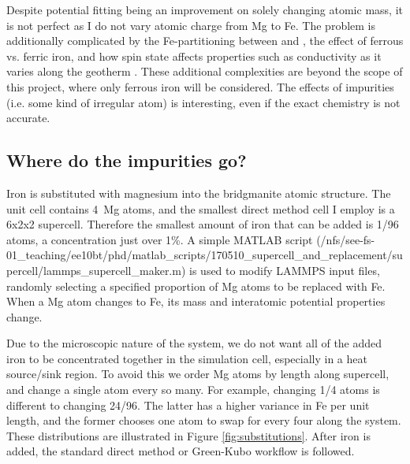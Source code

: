 Despite potential fitting being an improvement on solely changing atomic mass, it is not perfect as I do not vary atomic charge from Mg to Fe. The problem is additionally complicated by the Fe-partitioning between \mgsios and \mgo, the effect of ferrous vs. ferric iron, and how spin state affects properties such as conductivity as it varies along the geotherm \citep[e.g.][]{Ohta2017}. These additional complexities are beyond the scope of this project, where only ferrous iron will be considered. The effects of impurities (i.e. some kind of irregular atom) is interesting, even if the exact chemistry is not accurate.



\subsection{Where do the impurities go?} 

Iron is substituted with magnesium into the bridgmanite atomic structure. The unit cell contains 4~Mg atoms, and the smallest direct method cell I employ is a 6x2x2 supercell. Therefore the smallest amount of iron that can be added is 1/96 atoms, a concentration just over 1\%. A simple MATLAB script (/nfs/see-fs-01\_teaching/ee10bt/phd/matlab\_scripts/170510\_supercell\_and\_replacement/supercell/lammps\_supercell\_maker.m) is used to modify LAMMPS input files, randomly selecting a specified proportion of Mg atoms to be replaced with Fe. When a Mg atom changes to Fe, its mass and interatomic potential properties change. 

Due to the microscopic nature of the system, we do not want all of the added iron to be concentrated together in the simulation cell, especially in a heat source/sink region. To avoid this we order Mg atoms by length along supercell, and change a single atom every so many. For example, changing 1/4 atoms is different to changing 24/96. The latter has a higher variance in Fe per unit length, and the former chooses one atom to swap for every four along the system. These distributions are illustrated in Figure \ref{fig:substitutions}. After iron is added, the standard direct method or Green-Kubo workflow is followed.

